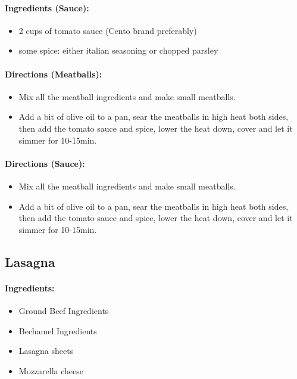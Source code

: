\documentclass{article}
\begin{document}
\paragraph{Ingredients (Sauce):}
\begin{itemize}
    \item 2 cups of tomato sauce (Cento brand preferably)
    \item some spice: either italian seasoning or chopped parsley
\end{itemize}  

\paragraph{Directions (Meatballs):}
\begin{itemize}
    \item Mix all the meatball ingredients and make small meatballs.
    \item Add a bit of olive oil to a pan, sear the meatballs in high heat both sides, then add the tomato sauce and spice, lower the heat down, cover and let it simmer for 10-15min.
\end{itemize}  

\paragraph{Directions (Sauce):}
\begin{itemize}
    \item Mix all the meatball ingredients and make small meatballs.
    \item Add a bit of olive oil to a pan, sear the meatballs in high heat both sides, then add the tomato sauce and spice, lower the heat down, cover and let it simmer for 10-15min.
\end{itemize} 

\subsection{Lasagna}

\paragraph{Ingredients:}
\begin{itemize}
    \item Ground Beef Ingredients
    \item Bechamel Ingredients
    \item Lasagna sheets
    \item Mozzarella cheese
\end{itemize}
\end{document}
